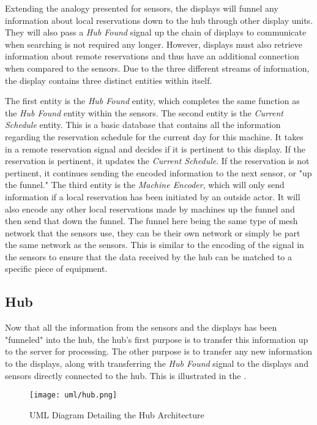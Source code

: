 \documentclass[PPFS.tex]{template/subfiles}
\newcommand{\sn}[1]{\textit{#1}}
\begin{document}
Extending the analogy presented for sensors, the displays will funnel any information about local reservations down to the hub through other display units. They will also pass a \sn{Hub Found} signal up the chain of displays to communicate when searching is not required any longer. However, displays must also retrieve information about remote reservations and thus have an additional connection when compared to the sensors. Due to the three different streams of information, the display contains three distinct entities within itself.

The first entity is the \sn{Hub Found} entity, which completes the same function as the \sn{Hub Found} entity within the sensors. The second entity is the \sn{Current Schedule} entity. This is a basic database that contains all the information regarding the reservation schedule for the current day for this machine. It takes in a remote reservation signal and decides if it is pertinent to this display. If the reservation is pertinent, it updates the \sn{Current Schedule}. If the reservation is not pertinent, it continues sending the encoded information to the next sensor, or "up the funnel." The third entity is the \sn{Machine Encoder}, which will only send information if a local reservation has been initiated by an outside actor. It will also encode any other local reservations made by machines up the funnel and then send that down the funnel. The funnel here being the same type of mesh network that the sensors use, they can be their own network or simply be part the same network as the sensors. This is similar to the encoding of the signal in the sensors to ensure that the data received by the hub can be matched to a specific piece of equipment.

\subsection{Hub}

Now that all the information from the sensors and the displays has been "funneled" into the hub, the hub's first purpose is to transfer this information up to the server for processing. The other purpose is to transfer any new information to the displays, along with transferring the \sn{Hub Found} signal to the displays and sensors directly connected to the hub. This is illustrated in the .

\begin{figure}[H]
    \centering
    \texttt{[image: uml/hub.png]}
    \caption{UML Diagram Detailing the Hub Architecture}
    \label{fig:hub_arch}
\end{figure}
\end{document}
